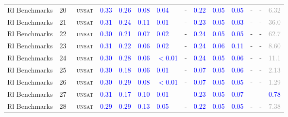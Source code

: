 \begin{center}
{\begin{longtable}{@{}llllllllllllll@{}}
Rl Benchmarks & 20 & ~\textsc{unsat} & \textcolor{blue}{0.33} & \textcolor{blue}{0.26} & \textcolor{blue}{0.08} & \textcolor{blue}{0.04} & - & \textcolor{blue}{0.22} & \textcolor{blue}{0.05} & \textcolor{blue}{0.05} & - & - & \textcolor{darkgray}{6.32} \\
Rl Benchmarks & 21 & ~\textsc{unsat} & \textcolor{blue}{0.31} & \textcolor{blue}{0.24} & \textcolor{blue}{0.11} & \textcolor{blue}{0.01} & - & \textcolor{blue}{0.23} & \textcolor{blue}{0.05} & \textcolor{blue}{0.03} & - & - & \textcolor{darkgray}{36.0} \\
Rl Benchmarks & 22 & ~\textsc{unsat} & \textcolor{blue}{0.30} & \textcolor{blue}{0.21} & \textcolor{blue}{0.07} & \textcolor{blue}{0.02} & - & \textcolor{blue}{0.24} & \textcolor{blue}{0.05} & \textcolor{blue}{0.05} & - & - & \textcolor{darkgray}{62.7} \\
Rl Benchmarks & 23 & ~\textsc{unsat} & \textcolor{blue}{0.31} & \textcolor{blue}{0.22} & \textcolor{blue}{0.06} & \textcolor{blue}{0.02} & - & \textcolor{blue}{0.24} & \textcolor{blue}{0.06} & \textcolor{blue}{0.11} & - & - & \textcolor{darkgray}{8.60} \\
Rl Benchmarks & 24 & ~\textsc{unsat} & \textcolor{blue}{0.30} & \textcolor{blue}{0.28} & \textcolor{blue}{0.06} & \textcolor{blue}{$<$0.01} & - & \textcolor{blue}{0.24} & \textcolor{blue}{0.05} & \textcolor{blue}{0.06} & - & - & \textcolor{darkgray}{11.1} \\
Rl Benchmarks & 25 & ~\textsc{unsat} & \textcolor{blue}{0.30} & \textcolor{blue}{0.18} & \textcolor{blue}{0.06} & \textcolor{blue}{0.01} & - & \textcolor{blue}{0.07} & \textcolor{blue}{0.05} & \textcolor{blue}{0.06} & - & - & \textcolor{darkgray}{2.13} \\
Rl Benchmarks & 26 & ~\textsc{unsat} & \textcolor{blue}{0.30} & \textcolor{blue}{0.29} & \textcolor{blue}{0.08} & \textcolor{blue}{$<$0.01} & - & \textcolor{blue}{0.07} & \textcolor{blue}{0.05} & \textcolor{blue}{0.05} & - & - & \textcolor{darkgray}{1.29} \\
Rl Benchmarks & 27 & ~\textsc{unsat} & \textcolor{blue}{0.31} & \textcolor{blue}{0.17} & \textcolor{blue}{0.10} & \textcolor{blue}{0.01} & - & \textcolor{blue}{0.23} & \textcolor{blue}{0.05} & \textcolor{blue}{0.07} & - & - & \textcolor{blue}{0.78} \\
Rl Benchmarks & 28 & ~\textsc{unsat} & \textcolor{blue}{0.29} & \textcolor{blue}{0.29} & \textcolor{blue}{0.13} & \textcolor{blue}{0.05} & - & \textcolor{blue}{0.22} & \textcolor{blue}{0.05} & \textcolor{blue}{0.05} & - & - & \textcolor{darkgray}{7.38} \\

\end{longtable}}
\end{center}
